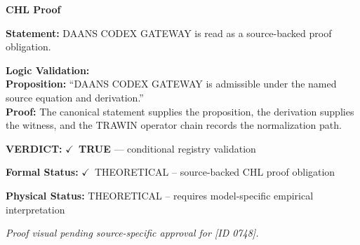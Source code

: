 \vspace{0.45em}
\noindent\textbf{CHL Proof}\par
\textbf{Statement:} DAANS CODEX GATEWAY is read as a source-backed proof obligation.

\textbf{Logic Validation:}\\
\textbf{Proposition:} ``DAANS CODEX GATEWAY is admissible under the named source equation and derivation.''\\
\textbf{Proof:} The canonical statement supplies the proposition, the derivation supplies the witness, and the TRAWIN operator chain records the normalization path.

\textbf{VERDICT:} \ensuremath{\checkmark}\ \textbf{TRUE} --- conditional registry validation

\textbf{Formal Status:} \ensuremath{\checkmark}\ THEORETICAL -- source-backed CHL proof obligation

\textbf{Physical Status:} THEORETICAL -- requires model-specific empirical interpretation
\par\vspace{0.45em}
\par
\vfill
\begingroup\footnotesize\itshape
Proof visual pending source-specific approval for [ID 0748].
\par\endgroup
\vfill
\endgroup
\endgroup
